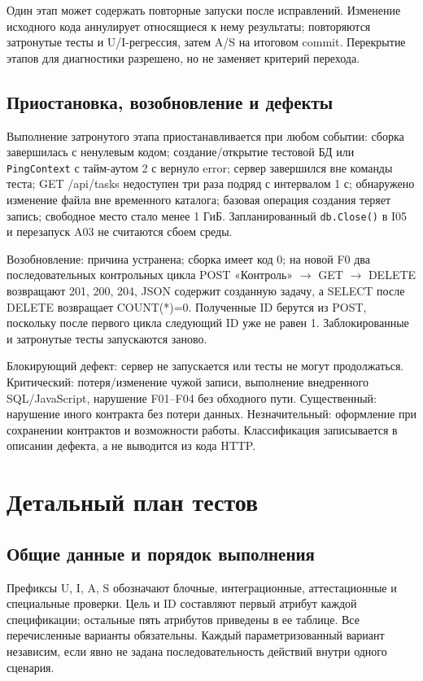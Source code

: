 \documentclass[12pt,a4paper]{extarticle}
\newcommand{\code}[1]{\nolinkurl{#1}}
\newcommand{\mainsection}[1]{\clearpage\section{#1}}
\begin{document}
Один этап может содержать повторные запуски после исправлений.
Изменение исходного кода аннулирует относящиеся к нему результаты;
повторяются затронутые тесты и U/I-регрессия, затем A/S на итоговом commit.
Перекрытие этапов для диагностики разрешено, но не заменяет критерий перехода.

\subsection{Приостановка, возобновление и дефекты}
Выполнение затронутого этапа приостанавливается при любом событии:
сборка завершилась с ненулевым кодом; создание/открытие тестовой БД
или \code{PingContext} с тайм-аутом 2 с вернуло error;
сервер завершился вне команды теста; GET /api/tasks недоступен
три раза подряд с интервалом 1 с; обнаружено изменение файла
вне временного каталога; базовая операция создания теряет запись;
свободное место стало менее 1 ГиБ. Запланированный \code{db.Close()}
в I05 и перезапуск A03 не считаются сбоем среды.

Возобновление: причина устранена; сборка имеет код 0;
на новой F0 два последовательных контрольных цикла
POST «Контроль» $\rightarrow$ GET $\rightarrow$ DELETE возвращают
201, 200, 204, JSON содержит созданную задачу, а SELECT после DELETE
возвращает COUNT(*)=0. Полученные ID берутся из POST, поскольку
после первого цикла следующий ID уже не равен 1.
Заблокированные и затронутые тесты запускаются заново.

Блокирующий дефект: сервер не запускается или тесты не могут
продолжаться. Критический: потеря/изменение чужой записи, выполнение
внедренного SQL/JavaScript, нарушение F01--F04 без обходного пути.
Существенный: нарушение иного контракта без потери данных.
Незначительный: оформление при сохранении контрактов и возможности работы.
Классификация записывается в описании дефекта, а не выводится из кода HTTP.

\mainsection{Детальный план тестов}
\subsection{Общие данные и порядок выполнения}
Префиксы U, I, A, S обозначают блочные, интеграционные,
аттестационные и специальные проверки. Цель и ID составляют
первый атрибут каждой спецификации; остальные пять атрибутов
приведены в ее таблице. Все перечисленные варианты обязательны.
Каждый параметризованный вариант независим, если явно не задана
последовательность действий внутри одного сценария.
\end{document}
